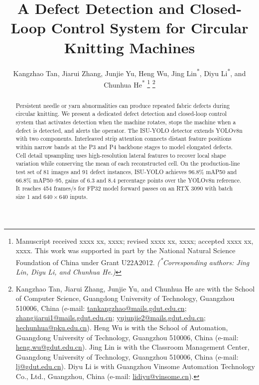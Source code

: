 \documentclass[lettersize,journal]{IEEEtran}
\begin{document}
\raggedbottom

\title{A Defect Detection and Closed-Loop Control System for Circular Knitting Machines}

\author{Kangzhao Tan, Jiarui Zhang, Junjie Yu, Heng Wu, Jing Lin\textsuperscript{*}, Diyu Li\textsuperscript{*}, and Chunhua He\textsuperscript{*}%
\thanks{Manuscript received xxxx xx, xxxx; revised xxxx xx, xxxx; accepted xxxx xx, xxxx. This work was supported in part by the National Natural Science Foundation of China under Grant U22A2012. \textit{(\textsuperscript{*}Corresponding authors: Jing Lin, Diyu Li, and Chunhua He.)}}%
\thanks{\begingroup{}Kangzhao Tan, Jiarui Zhang, Junjie Yu, and Chunhua He are with the School of Computer Science, Guangdong University of Technology, Guangzhou 510006, China (e-mail: \protect\url{tankangzhao@mails.gdut.edu.cn}; \protect\url{zhangjiarui1@mails.gdut.edu.cn}; \protect\url{yujunjie2@mails.gdut.edu.cn}; \protect\url{hechunhua@pku.edu.cn}). Heng Wu is with the School of Automation, Guangdong University of Technology, Guangzhou 510006, China (e-mail: \protect\url{heng.wu@gdut.edu.cn}). Jing Lin is with the Classroom Management Center, Guangdong University of Technology, Guangzhou 510006, China (e-mail: \protect\url{lj@gdut.edu.cn}). Diyu Li is with Guangzhou Vinsome Automation Technology Co., Ltd., Guangzhou, China (e-mail: \protect\url{lidiyu@vinsome.cn}).\endgroup}%
}

\maketitle

\begin{abstract}
Persistent needle or yarn abnormalities can produce repeated fabric defects during circular knitting. We present a dedicated defect detection and closed-loop control system that activates detection when the machine rotates, stops the machine when a defect is detected, and alerts the operator. The ISU-YOLO detector extends YOLOv8n with two components. Interleaved strip attention connects distant feature positions within narrow bands at the P3 and P4 backbone stages to model elongated defects. Cell detail upsampling uses high-resolution lateral features to recover local shape variation while conserving the mean of each reconstructed cell. On the production-line test set of 81 images and 91 defect instances, ISU-YOLO achieves 96.8\% mAP50 and 66.8\% mAP50--95, gains of 6.3 and 8.4 percentage points over the YOLOv8n reference. It reaches 454 frames/s for FP32 model forward passes on an RTX 3090 with batch size 1 and \(640\times640\) inputs.
\end{abstract}
\end{document}
